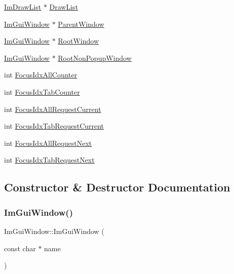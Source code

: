 \begin{DoxyCompactItemize}
\item 
\hyperlink{struct_im_draw_list}{Im\+Draw\+List} $\ast$ \hyperlink{struct_im_gui_window_a39de4668b09754136c6fd7ab89ab674a}{Draw\+List}
\item 
\hyperlink{struct_im_gui_window}{Im\+Gui\+Window} $\ast$ \hyperlink{struct_im_gui_window_a5f0b37cb12fbeb3efe00d0cd826d5d65}{Parent\+Window}
\item 
\hyperlink{struct_im_gui_window}{Im\+Gui\+Window} $\ast$ \hyperlink{struct_im_gui_window_aef9281297b0993c8f1b7c1ff7987cb61}{Root\+Window}
\item 
\hyperlink{struct_im_gui_window}{Im\+Gui\+Window} $\ast$ \hyperlink{struct_im_gui_window_a43b1e2ffa15d572f4d0ce4fbbeb5595f}{Root\+Non\+Popup\+Window}
\item 
int \hyperlink{struct_im_gui_window_a51ee526aed5b993e0a849f2db1fdc4dc}{Focus\+Idx\+All\+Counter}
\item 
int \hyperlink{struct_im_gui_window_a7e3e75ec3d66d04801bfffdd02643d3c}{Focus\+Idx\+Tab\+Counter}
\item 
int \hyperlink{struct_im_gui_window_adfbeeeaa2eebd054ec0cd99dccb34f2f}{Focus\+Idx\+All\+Request\+Current}
\item 
int \hyperlink{struct_im_gui_window_a71c9ea6561a07160e5ce552db1d64b0b}{Focus\+Idx\+Tab\+Request\+Current}
\item 
int \hyperlink{struct_im_gui_window_a152487f402088ce413bb6c215b308c34}{Focus\+Idx\+All\+Request\+Next}
\item 
int \hyperlink{struct_im_gui_window_af7e93a1027da314fe73b64d97bfa73be}{Focus\+Idx\+Tab\+Request\+Next}
\end{DoxyCompactItemize}


\subsection{Constructor \& Destructor Documentation}
\hypertarget{struct_im_gui_window_abbc943558e96c8895237f0b55a66751b}{}\label{struct_im_gui_window_abbc943558e96c8895237f0b55a66751b} 
\subsubsection{\texorpdfstring{Im\+Gui\+Window()}{ImGuiWindow()}}
{\footnotesize\ttfamily Im\+Gui\+Window\+::\+Im\+Gui\+Window (\begin{DoxyParamCaption}\item[{const char $\ast$}]{name }\end{DoxyParamCaption})}

